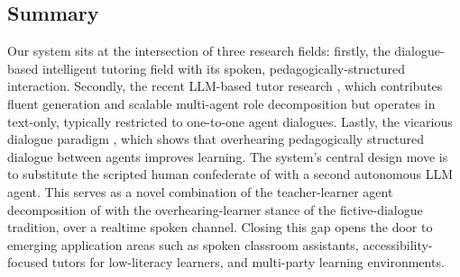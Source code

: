 \subsection{Summary}
\label{sec:prev_work_summary}

Our system sits at the intersection of three research fields: firstly, the
dialogue-based intelligent tutoring field
\citep{litman2004itspoke, pon-barry2004scot} with its spoken,
pedagogically-structured interaction. Secondly, the recent LLM-based tutor
research \citep{SpangenbergerPia2026CwaL, pei-etal-2025conversational},
which contributes fluent generation and scalable multi-agent role
decomposition but operates in text-only, typically restricted to one-to-one agent dialogues. 
Lastly, the vicarious dialogue paradigm
\citep{vicarious_learning, piwek2007t2d, fictive_dialogs}, which shows
that overhearing pedagogically structured dialogue between agents
improves learning. The system's central design move is to substitute
the scripted human confederate of \citet{fictive_dialogs} with a
second autonomous LLM agent. This serves as a novel combination of the teacher-learner agent
decomposition of \citet{pei-etal-2025conversational} with the
overhearing-learner stance of the fictive-dialogue tradition, over a
realtime spoken channel. Closing this gap opens the door to emerging
application areas such as spoken classroom assistants, 
accessibility-focused tutors for low-literacy learners, and multi-party
learning environments.
